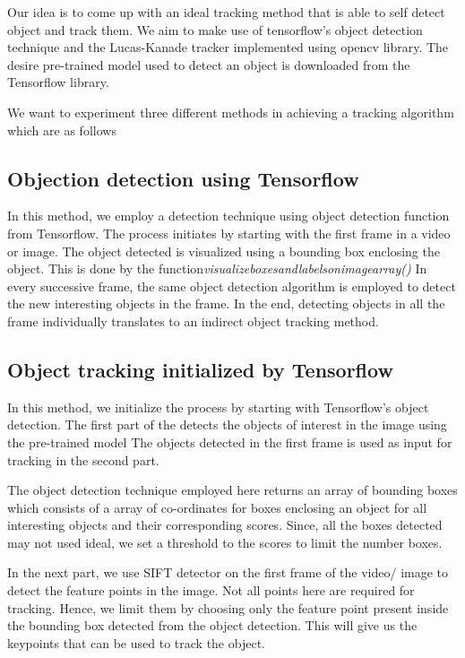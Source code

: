 \documentclass[10pt,twocolumn,letterpaper]{article}
\begin{document}
Our idea is to come up with an ideal tracking method that is able to self detect object and track them. We aim to make use of tensorflow's object detection technique and the Lucas-Kanade tracker implemented using opencv library. The desire pre-trained model used to detect an object is downloaded from the Tensorflow library.

We want to experiment three different methods in achieving a tracking algorithm which are as follows

\subsection{Objection detection using Tensorflow}
In this method, we employ a detection technique using object detection function from Tensorflow. The process initiates by starting with the first frame in a video or image. The object detected is visualized using a bounding box enclosing the object. This is done by the function\textit{visualize\textunderscore boxes\textunderscore and\textunderscore labels\textunderscore on\textunderscore image\textunderscore array()}  In every successive frame, the same object detection algorithm is employed to detect the new interesting objects in the frame. In the end, detecting  objects in all the frame individually translates to an indirect object tracking method.

\subsection{Object tracking initialized by Tensorflow}

In this method, we initialize the process by starting with Tensorflow's object detection. The first part of the detects the objects of interest in the image using the pre-trained model The objects detected in the first frame is used as input for tracking in the second part.

The object detection technique employed here returns an array of bounding boxes which consists of a array of co-ordinates for boxes enclosing an object for all interesting objects and their corresponding scores. Since, all the boxes detected may not used ideal, we set a threshold to the scores to limit the number boxes.

In the next part, we use SIFT detector on the first frame of the video/ image to detect the feature points in the image. Not all points here are required for tracking. Hence, we limit them by choosing only the feature point present inside the bounding box detected from the object detection. This will give us the keypoints that can be used to track the object.
\end{document}
